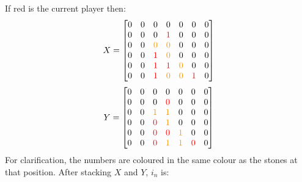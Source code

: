 \documentclass[12pt]{article}
\newcommand{\mathColor}[2]{\color{#1}#2\color{black}}
\newcommand{\gold}{YellowOrange}
\begin{document}
If red is the current player then:
\[
X = \left[
\begin{matrix}
\mathColor{black}{0} & \mathColor{black}{0} & \mathColor{black}{0} & \mathColor{black}{0} & \mathColor{black}{0} & \mathColor{black}{0} & \mathColor{black}{0}\\
\mathColor{black}{0} & \mathColor{black}{0} & \mathColor{black}{0} & \mathColor{red}{1}     & \mathColor{black}{0} & \mathColor{black}{0} & \mathColor{black}{0}\\
\mathColor{black}{0} & \mathColor{black}{0} & \mathColor{\gold}{0} & \mathColor{\gold}{0} & \mathColor{black}{0} & \mathColor{black}{0} & \mathColor{black}{0}\\
\mathColor{black}{0} & \mathColor{black}{0} & \mathColor{red}{1}     & \mathColor{\gold}{0} & \mathColor{black}{0} & \mathColor{black}{0} & \mathColor{black}{0}\\
\mathColor{black}{0} & \mathColor{black}{0} & \mathColor{red}{1}     & \mathColor{red}{1}     & \mathColor{\gold}{0} & \mathColor{black}{0} & \mathColor{black}{0}\\
\mathColor{black}{0} & \mathColor{black}{0} & \mathColor{red}{1}     & \mathColor{\gold}{0} & \mathColor{\gold}{0} & \mathColor{red}{1}     & \mathColor{black}{0}\\
\end{matrix}
\right]
\]\[
Y= \left[
\begin{matrix}
\mathColor{black}{0} & \mathColor{black}{0} & \mathColor{black}{0} & \mathColor{black}{0} & \mathColor{black}{0} & \mathColor{black}{0} & \mathColor{black}{0}\\
\mathColor{black}{0} & \mathColor{black}{0} & \mathColor{black}{0} & \mathColor{red}{0}     & \mathColor{black}{0} & \mathColor{black}{0} & \mathColor{black}{0}\\
\mathColor{black}{0} & \mathColor{black}{0} & \mathColor{\gold}{1} & \mathColor{\gold}{1} & \mathColor{black}{0} & \mathColor{black}{0} & \mathColor{black}{0}\\
\mathColor{black}{0} & \mathColor{black}{0} & \mathColor{red}{0}     & \mathColor{\gold}{1} & \mathColor{black}{0} & \mathColor{black}{0} & \mathColor{black}{0}\\
\mathColor{black}{0} & \mathColor{black}{0} & \mathColor{red}{0}     & \mathColor{red}{0}     & \mathColor{\gold}{1} & \mathColor{black}{0} & \mathColor{black}{0}\\
\mathColor{black}{0} & \mathColor{black}{0} & \mathColor{red}{0}     & \mathColor{\gold}{1} & \mathColor{\gold}{1} & \mathColor{red}{0}     & \mathColor{black}{0}\\
\end{matrix}
\right]
\] For clarification, the numbers are coloured in the same colour as the stones at that position. After stacking \(X\) and \(Y\), \(i_n\) is:
\end{document}

